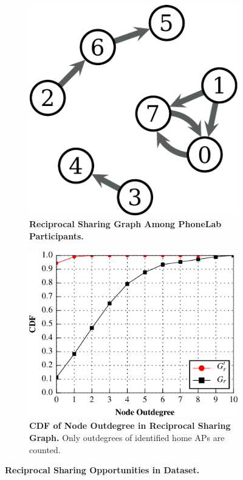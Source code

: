 \begin{figure}[t]
  \centering
  \begin{subfigure}{\columnwidth}
    \centering
    \includegraphics[width=0.5\columnwidth]{./figures/ReciprocalSharingFigure.pdf}
    \caption{\textbf{Reciprocal Sharing Graph Among PhoneLab Participants.}}
    \label{fig:reciprocal}
  \end{subfigure}
  \begin{subfigure}{\columnwidth}
    \includegraphics[width=\columnwidth]{./figures/SpatialSparseFigure.pdf}
    \caption{\textbf{CDF of Node Outdegree in Reciprocal Sharing Graph.} Only
    outdegrees of identified \PhoneLab{} home APs are counted. }
    \label{fig:sparse}
  \end{subfigure}
  \caption{\textbf{Reciprocal Sharing Opportunities in \PhoneLab{} Dataset.}}
  \vspace*{-3mm}
\end{figure}

